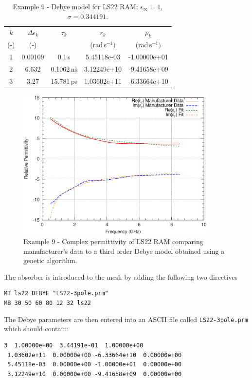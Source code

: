 \documentclass[onecolumn,a4paper]{article}
\numberwithin{equation}{section}
\begin{document}
\begin{table}[ht]
\begin{center}
\begin{tabular}{|c|c|c|c|c|}
\hline
$k$     &$\Delta \epsilon_k$ &$\tau_k$   &$r_k$           &$p_k$           \\
(-)     &(-)                 &           &(rad\,s$^{-1})$ &(rad\,s$^{-1})$ \\
\hline
1       &0.00109             &0.1\,s     &5.45118e-03     &-1.00000e+01    \\
2       &6.632               &0.1062\,ns &3.12249e+10     &-9.41658e+09    \\
3       &3.27                &15.781\,ps &1.03602e+11     &-6.33664e+10    \\
\hline
\end{tabular}
\caption{\label{tb:ls22debye}Example 9 - Debye model for LS22 RAM: $\epsilon_\infty=1$, $\sigma=0.344191$.}
\end{center}
\end{table}

\begin{figure}[ht!]
 \centerline{\includegraphics[width=10cm]{figures/LS22-3pole}}
 \caption{\label{fg:ls22fit} Example 9 - Complex permittivity of LS22 RAM comparing manufacturer's data to
 a third order Debye model obtained using a genetic algorithm.}
\end{figure}

The absorber is introduced to the mesh by adding the following two directives
\begin{verbatim}
MT ls22 DEBYE "LS22-3pole.prm"
MB 30 50 60 80 12 32 ls22
\end{verbatim}
The Debye parameters are then entered into an ASCII file called \texttt{LS22-3pole.prm}
which should contain:
\begin{verbatim}
3  1.00000e+00  3.44191e-01  1.00000e+00
 1.03602e+11  0.00000e+00 -6.33664e+10  0.00000e+00
 5.45118e-03  0.00000e+00 -1.00000e+01  0.00000e+00
 3.12249e+10  0.00000e+00 -9.41658e+09  0.00000e+00
\end{verbatim}
\end{document}
